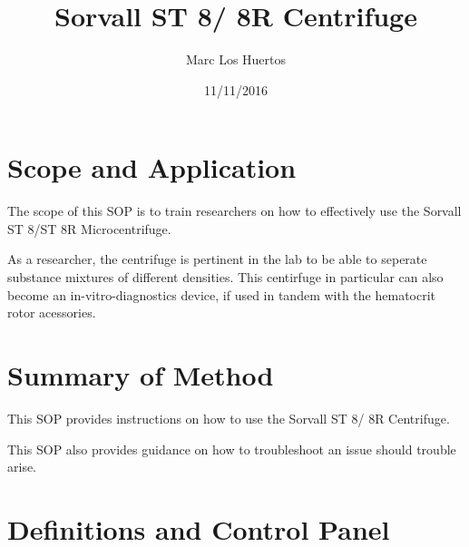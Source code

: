 \documentclass[12pt]{../SOP3_beta}
\title{Sorvall ST 8/ 8R Centrifuge}
\date{11/11/2016}
\author{Marc Los Huertos}
\begin{document}


\maketitle

\section{Scope and Application}

\NP The scope of this SOP is to train researchers on how to effectively use the Sorvall ST 8/ST 8R Microcentrifuge.

\NP As a researcher, the centrifuge is pertinent in the lab to be able to seperate substance mixtures of different densities. This centirfuge in particular can also become an in-vitro-diagnostics device, if used in tandem with the hematocrit rotor acessories. 


\section{Summary of Method}

\NP This SOP provides instructions on how to use the Sorvall ST 8/ 8R Centrifuge.

\NP This SOP also provides guidance on how to troubleshoot an issue should trouble arise. 

\section{Definitions and Control Panel}
\end{document}
